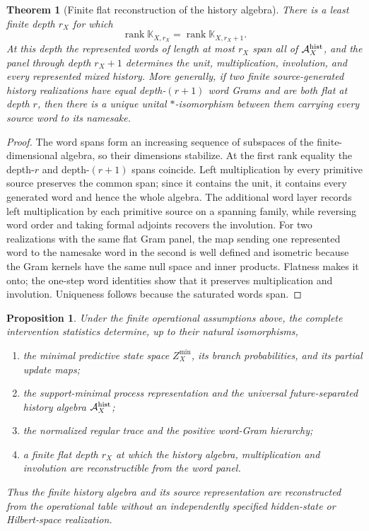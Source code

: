 \documentclass[11pt]{article}
\newtheorem{theorem}{Theorem}[section]
\newtheorem{proposition}[proposition]{Proposition}
\theoremstyle{definition}
\theoremstyle{remark}
\theoremstyle{definition}
\theoremstyle{remark}
\newcommand{\rank}{\operatorname{rank}}
\newcommand{\A}{\mathcal A}
\begin{document}
\begin{theorem}[Finite flat reconstruction of the history algebra]
\label{thm:ncg-flat-history-reconstruction}
There is a least finite depth $r_X$ for which
\begin{equation}
 \rank\mathbb K_{X,r_X}=\rank\mathbb K_{X,r_X+1}.
 \label{eq:ncg-flat-rank}
\end{equation}
At this depth the represented words of length at most $r_X$ span all of
$\A_X^{\rm hist}$, and the panel through depth $r_X+1$ determines the unit,
multiplication, involution, and every represented mixed history.  More generally,
if two finite source-generated history realizations have equal depth-$(r+1)$ word
Grams and are both flat at depth $r$, then there is a unique unital
$*$-isomorphism between them carrying every source word to its namesake.
\end{theorem}

\begin{proof}
The word spans form an increasing sequence of subspaces of the finite-dimensional
algebra, so their dimensions stabilize.  At the first rank equality the depth-$r$
and depth-$(r+1)$ spans coincide.  Left multiplication by every primitive source
preserves the common span; since it contains the unit, it contains every generated
word and hence the whole algebra.  The additional word layer records left
multiplication by each primitive source on a spanning family, while reversing word order
and taking formal adjoints recovers the involution.  For two realizations with the same flat
Gram panel, the map sending one represented word to the namesake word in the
second is well defined and isometric because the Gram kernels have the same null
space and inner products.  Flatness makes it onto; the one-step word identities
show that it preserves multiplication and involution.  Uniqueness follows because
the saturated words span.
\end{proof}

\begin{proposition}
\label{prop:ncg-grand-tensor-reconstruction}
Under the finite operational assumptions above, the complete intervention
statistics determine, up to their natural isomorphisms,
\begin{enumerate}[label=\textup{(\roman*)},leftmargin=2.8em]
\item the minimal predictive state space $Z_X^{\min}$, its branch probabilities, and its partial update maps;
\item the support-minimal process representation and the universal future-separated
      history algebra $\A_X^{\rm hist}$;
\item the normalized regular trace and the positive word-Gram hierarchy;
\item a finite flat depth $r_X$ at which the history algebra, multiplication and
      involution are reconstructible from the word panel.
\end{enumerate}
Thus the finite history algebra and its source representation are reconstructed
from the operational table without an independently specified hidden-state or
Hilbert-space realization.
\end{proposition}
\end{document}
